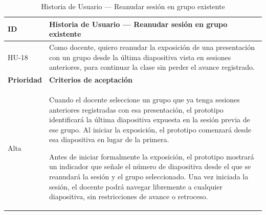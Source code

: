 \documentclass[11pt]{article}
\newcommand{\ttstyle}{%
  \small
  \setlength{\tabcolsep}{6pt}%
  \renewcommand{\arraystretch}{1.25}%
  \arrayrulecolor{azulprofundo}%
}
\newcommand{\hairrule}{%
  \arrayrulecolor{azulregla}\midrule[0.3pt]\arrayrulecolor{azulprofundo}%
}
\begin{document}
\begin{table}[H]
    \centering
    \renewcommand{\arraystretch}{1.2}
    \ttstyle
    \begin{tabular}{p{2.5cm}p{11cm}}
        \toprule
        \textbf{ID} & \textbf{Historia de Usuario --- Reanudar sesión en grupo existente} \\
        \midrule
        HU-18 & Como docente, quiero reanudar la exposición de una presentación con un grupo desde la última diapositiva vista en sesiones anteriores, para continuar la clase sin perder el avance registrado. \\
        \hairrule
        \textbf{Prioridad} & \textbf{Criterios de aceptación} \\
        \hairrule
        Alta & Cuando el docente seleccione un grupo que ya tenga sesiones anteriores registradas con esa presentación, el prototipo identificará la última diapositiva expuesta en la sesión previa de ese grupo. Al iniciar la exposición, el prototipo comenzará desde esa diapositiva en lugar de la primera.

        Antes de iniciar formalmente la exposición, el prototipo mostrará un indicador que señale el número de diapositiva desde el que se reanudará la sesión y el grupo seleccionado. Una vez iniciada la sesión, el docente podrá navegar libremente a cualquier diapositiva, sin restricciones de avance o retroceso. \\
        \bottomrule
    \end{tabular}
    \caption{Historia de Usuario --- Reanudar sesión en grupo existente}
    \label{tab:hu-reanudar-sesion-grupo}
\end{table}
\end{document}
